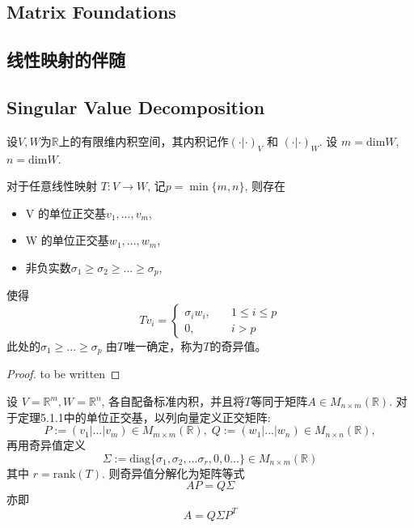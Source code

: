 \documentclass[11pt,fleqn]{book} %
\def\R{\mathbb{R}}
\begin{document}
\begin{CJK}{UTF8}{gkai}
\chapter{Matrix Foundations}

\section{线性映射的伴随}

\section{Singular Value Decomposition}
设$V, W$为$\R$上的有限维内积空间，其内积记作$(\cdot | \cdot)_V$ 和 $(\cdot | \cdot)_W$. 设 $m = \text{dim} W$, $n = \text{dim} W$.
\begin{theorem}
    [SVD] 对于任意线性映射 $T: V \to W$, 记$p = \min \{m, n\}$, 则存在 \\
    \begin{itemize}
        \item V 的单位正交基$v_1,...,v_m$, \\
        \item W 的单位正交基$w_1, ..., w_m$, \\
        \item 非负实数$\sigma_1 \geq \sigma_2 \geq ... \geq \sigma_p$, 
    \end{itemize}
    使得
    \[
        Tv_i = \begin{cases}
            \sigma_iw_i, \quad &1 \leq i \leq p \\
            0, \quad &i > p 
        \end{cases}\]
    此处的$\sigma_1 \geq ... \geq \sigma_p$ 由$T$唯一确定，称为$T$的奇异值。
\end{theorem}

\begin{proof}
    to be written
\end{proof}

\begin{theorem}
    [矩阵版本] 设 $V = \R^m, W = \R^n$, 各自配备标准内积，并且将$T$等同于矩阵$A \in M_{n \times m}(\R)$. 对于定理5.1.1中的单位正交基，以列向量定义正交矩阵:
    \[
        P := (v_1|...|v_m) \in M_{m \times m}(\R), \; Q := (w_1|...|w_n) \in M_{n \times n} (\R),\]
    再用奇异值定义
    \[
        \Sigma := \text{diag}\{\sigma_1, \sigma_2, ... \sigma_r, 0, 0...\} \in M_{n\times m}(\R)\]
        其中 $r = \text{rank}(T)$.
    则奇异值分解化为矩阵等式
    \[
        AP = Q\Sigma\]
    亦即 
    \[
        A = Q \Sigma P^T \]
\end{theorem}



\end{CJK}
\end{document}
